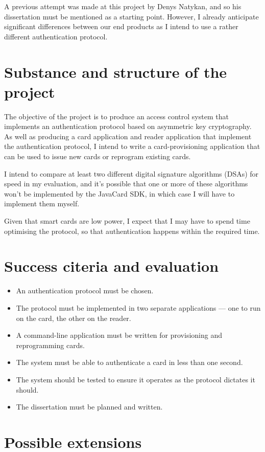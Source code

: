 \documentclass[12pt,a4paper,twoside]{article}
\begin{document}
A previous attempt was made at this project by Denys Natykan, and so his dissertation must be mentioned as a starting point. However, I already anticipate significant differences between our end products as I intend to use a rather different authentication protocol.

\section*{Substance and structure of the project}

The objective of the project is to produce an access control system that implements an authentication protocol based on asymmetric key cryptography. As well as producing a card application and reader application that implement the authentication protocol, I intend to write a card-provisioning application that can be used to issue new cards or reprogram existing cards.

I intend to compare at least two different digital signature algorithms (DSAs) for speed in my evaluation, and it's possible that one or more of these algorithms won't be implemented by the JavaCard SDK, in which case I will have to implement them myself.

Given that smart cards are low power, I expect that I may have to spend time optimising the protocol, so that authentication happens within the required time.

\section*{Success citeria and evaluation}

\begin{itemize}
\item An authentication protocol must be chosen.
\item The protocol must be implemented in two separate applications --- one
to run on the card, the other on the reader.
\item A command-line application must be written for provisioning and
reprogramming cards.
\item The system must be able to authenticate a card in less than one second.
\item The system should be tested to ensure it operates as the protocol dictates it should.
\item The dissertation must be planned and written.
\end{itemize}

\section*{Possible extensions}
\end{document}
